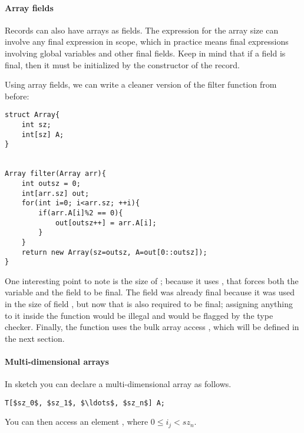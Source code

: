 \paragraph{Array fields}
Records can also have arrays as fields. The expression for the array size can involve any final expression in scope, which in practice means final expressions involving global variables and other final fields. Keep in mind that if a field is final, then it must be initialized by the constructor of the record.

\begin{Example}
Using array fields, we can write a cleaner version of the filter function from before:
\begin{lstlisting}
struct Array{
	int sz;
	int[sz] A;
}


Array filter(Array arr){
	int outsz = 0;
	int[arr.sz] out;
	for(int i=0; i<arr.sz; ++i){
		if(arr.A[i]%2 == 0){
			out[outsz++] = arr.A[i];
		}
	}
	return new Array(sz=outsz, A=out[0::outsz]);
}
\end{lstlisting}
One interesting point to note is the size of ; because it uses , that forces both the variable  and the field  to be final. The field  was already final because it was used in the size of field , but now that  is also required to be final; assigning anything to it inside the function would be illegal and would be flagged by the type checker. Finally, the function uses the bulk array access , which will be defined in the next section.
\end{Example}






\paragraph{Multi-dimensional arrays}
In sketch you can declare a multi-dimensional array as follows.
\begin{lstlisting}
T[$sz_0$, $sz_1$, $\ldots$, $sz_n$] A;
\end{lstlisting}
You can then access an element , where $0\leq i_j < sz_n$.

